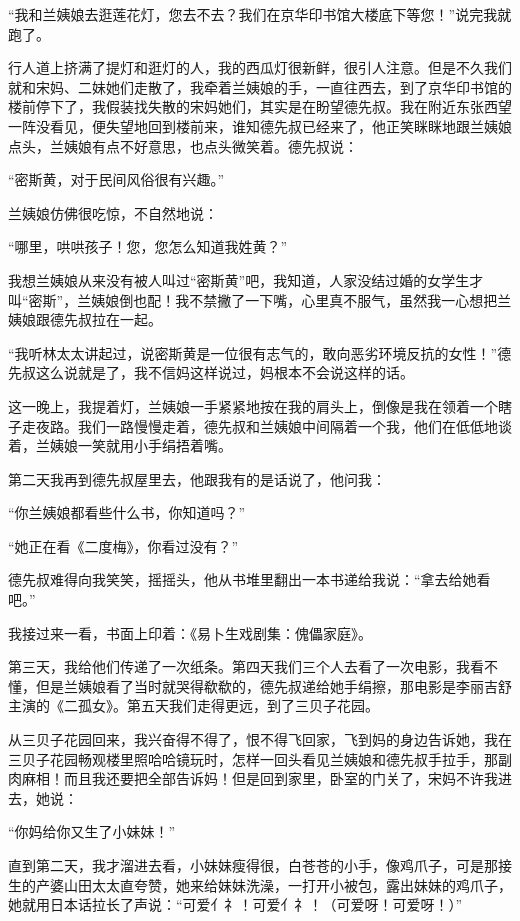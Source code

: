 \par “我和兰姨娘去逛莲花灯，您去不去？我们在京华印书馆大楼底下等您！”说完我就跑了。
\par 行人道上挤满了提灯和逛灯的人，我的西瓜灯很新鲜，很引人注意。但是不久我们就和宋妈、二妹她们走散了，我牵着兰姨娘的手，一直往西去，到了京华印书馆的楼前停下了，我假装找失散的宋妈她们，其实是在盼望德先叔。我在附近东张西望一阵没看见，便失望地回到楼前来，谁知德先叔已经来了，他正笑眯眯地跟兰姨娘点头，兰姨娘有点不好意思，也点头微笑着。德先叔说：
\par “密斯黄，对于民间风俗很有兴趣。”
\par 兰姨娘仿佛很吃惊，不自然地说：
\par “哪里，哄哄孩子！您，您怎么知道我姓黄？”
\par 我想兰姨娘从来没有被人叫过“密斯黄”吧，我知道，人家没结过婚的女学生才叫“密斯”，兰姨娘倒也配！我不禁撇了一下嘴，心里真不服气，虽然我一心想把兰姨娘跟德先叔拉在一起。
\par “我听林太太讲起过，说密斯黄是一位很有志气的，敢向恶劣环境反抗的女性！”德先叔这么说就是了，我不信妈这样说过，妈根本不会说这样的话。
\par 这一晚上，我提着灯，兰姨娘一手紧紧地按在我的肩头上，倒像是我在领着一个瞎子走夜路。我们一路慢慢走着，德先叔和兰姨娘中间隔着一个我，他们在低低地谈着，兰姨娘一笑就用小手绢捂着嘴。
\par 第二天我再到德先叔屋里去，他跟我有的是话说了，他问我：
\par “你兰姨娘都看些什么书，你知道吗？”
\par “她正在看《二度梅》，你看过没有？”
\par 德先叔难得向我笑笑，摇摇头，他从书堆里翻出一本书递给我说：“拿去给她看吧。”
\par 我接过来一看，书面上印着：《易卜生戏剧集：傀儡家庭》。
\par 第三天，我给他们传递了一次纸条。第四天我们三个人去看了一次电影，我看不懂，但是兰姨娘看了当时就哭得欷欷的，德先叔递给她手绢擦，那电影是李丽吉舒主演的《二孤女》。第五天我们走得更远，到了三贝子花园。
\par 从三贝子花园回来，我兴奋得不得了，恨不得飞回家，飞到妈的身边告诉她，我在三贝子花园畅观楼里照哈哈镜玩时，怎样一回头看见兰姨娘和德先叔手拉手，那副肉麻相！而且我还要把全部告诉妈！但是回到家里，卧室的门关了，宋妈不许我进去，她说：
\par “你妈给你又生了小妹妹！”
\par 直到第二天，我才溜进去看，小妹妹瘦得很，白苍苍的小手，像鸡爪子，可是那接生的产婆山田太太直夸赞，她来给妹妹洗澡，一打开小被包，露出妹妹的鸡爪子，她就用日本话拉长了声说：“可爱亻礻！可爱亻礻！（可爱呀！可爱呀！）”
